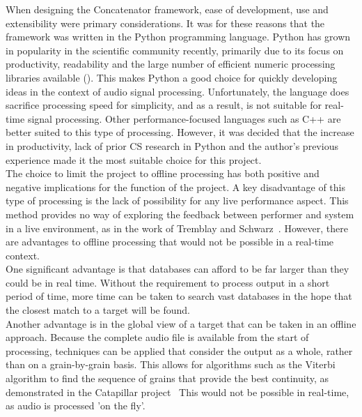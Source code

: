 \documentclass{scrartcl}
\begin{document}
    When designing the Concatenator framework, ease of development, use and
    extensibility were primary considerations. It was for these reasons that
    the framework was written in the Python programming language. Python has
    grown in popularity in the scientific community recently, primarily due to
    its focus on productivity, readability and the large number of efficient
    numeric processing libraries available (\cite{Pedregosa2011,
    Fangohr2014, Scipy}). This makes Python a good choice for
    quickly developing ideas in the context of audio signal processing.
    Unfortunately, the language does sacrifice processing speed for simplicity, 
    and as a result, is not suitable for real-time signal processing. Other
    performance-focused languages such as C++ are better suited to this type of
    processing. However, it was decided that the increase in productivity, lack
    of prior CS research in Python and the author's previous experience made
    it the most suitable choice for this project.\\

    The choice to limit the project to offline processing has both positive and
    negative implications for the function of the project. A key disadvantage
    of this type of processing is the lack of possibility for any live
    performance aspect. This method provides no way of exploring the feedback
    between performer and system in a live environment, as in the work
    of Tremblay and Schwarz~\citeyearpar{Tremblay2010}.
    However, there are advantages to offline processing that would not be
    possible in a real-time context.\\
    One significant advantage is that databases can afford to be far larger
    than they could be in real time. Without the requirement to process output in
    a short period of time, more time can be taken to search vast databases in
    the hope that the closest match to a target will be found.\\
    Another advantage is in the global view of a target that can be taken in an
    offline approach. Because the complete audio file is available from the
    start of processing, techniques can be applied that consider the output as
    a whole, rather than on a grain-by-grain basis. This allows for algorithms
    such as the Viterbi algorithm to find the sequence of grains that provide
    the best continuity, as demonstrated in the Catapillar
    project~\parencite[p. 4]{Schwarz2003} This would not be possible in
    real-time, as audio is processed 'on the fly'.\\
\end{document}
